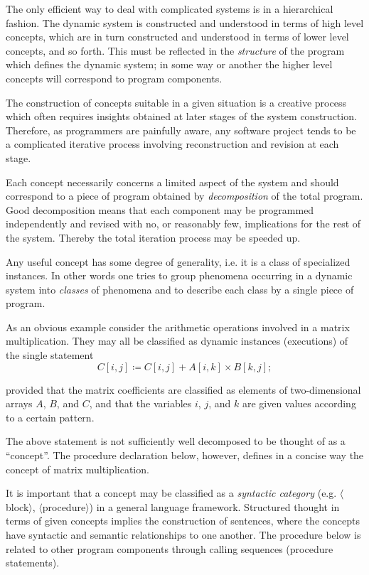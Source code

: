 \documentclass[twoside,11pt]{book}
\begin{document}
The only efficient way to deal with complicated systems is in a hierarchical fashion. The dynamic system is constructed and understood in terms of high level concepts, which are in turn constructed and understood in terms of lower level concepts, and so forth. This must be reflected in the \textit{structure} of the program which defines the dynamic system; in some way or another the higher level concepts will correspond to program components.

The construction of concepts suitable in a given situation is a creative process which often requires insights obtained at later stages of the system construction. Therefore, as programmers are painfully aware, any software project tends to be a complicated iterative process involving reconstruction and revision at each stage.

Each concept necessarily concerns a limited aspect of the system and
should correspond to a piece of program obtained by \textit{decomposition} of the total program. Good decomposition means that each component may be programmed independently and revised with no, or reasonably few, implications for the rest of the system. Thereby the total iteration process may be speeded up.

Any useful concept has some degree of generality, i.e. it is a class of
specialized instances. In other words one tries to group phenomena occurring in a dynamic system into \textit{classes} of phenomena and to describe each class by a single piece of program.

As an obvious example consider the arithmetic operations involved in a matrix multiplication. They may all be classified as dynamic instances (executions) of the single statement
$$
C[i, j] \coloneq C[i,j] + A[i, k] \times B[k, j];
$$

\noindent
provided that the matrix coefficients are classified as elements of two-dimensional arrays $A$, $B$, and $C$, and that the variables $i$, $j$, and $k$ are given values according to a certain pattern.

The above statement is not sufficiently well decomposed to be thought of as a ``concept''. The procedure declaration below, however, defines in a concise way the concept of matrix multiplication.

It is important that a concept may be classified as a \textit{syntactic category} (e.g. $\langle$block$\rangle$, $\langle$procedure$\rangle$) in a general language framework. Structured thought in terms of given concepts implies the construction of sentences, where the concepts have syntactic and semantic relationships to one another. The procedure below is related to other program components through calling sequences (procedure statements).
\end{document}

